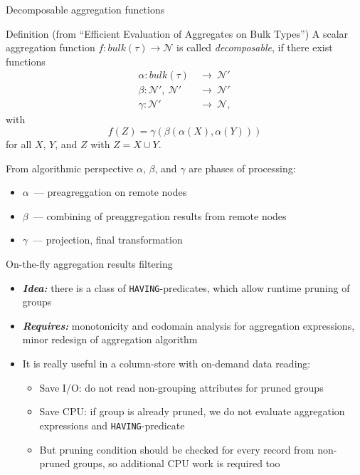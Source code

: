 \documentclass[compress, dvipsnames, unicode]{beamer}
\begin{document}
\begin{frame}{Decomposable aggregation functions}
	\begin{block}{Definition (from ``Efficient Evaluation of Aggregates on Bulk Types'')}
		A scalar aggregation function $f: bulk(\tau) \rightarrow \mathcal{N}$ is called \textit{decomposable}, if there exist functions
		\begin{align*}
		\alpha: bulk(\tau)\ &\rightarrow\ \mathcal{N'}\\
		\beta: \mathcal{N'},\ \mathcal{N'}\ &\rightarrow\ \mathcal{N'}\\
		\gamma: \mathcal{N'}\ &\rightarrow\ \mathcal{N},
		\end{align*}
		with $$f(Z) = \gamma(\beta(\alpha(X), \alpha(Y)))$$
		for all $X$, $Y$, and $Z$ with $Z = X \cup Y$.
	\end{block}

	From algorithmic perspective $\alpha$, $\beta$, and $\gamma$ are phases of processing:
	
	\begin{itemize}
		\item $\alpha$~--- preagreggation on remote nodes
		\item $\beta$~--- combining of preaggregation results from remote nodes
		\item $\gamma$~--- projection, final transformation
	\end{itemize}
\end{frame}


\begin{frame}{On-the-fly aggregation results filtering}
    \begin{itemize}
        \setlength\itemsep{1em}	
        \item \textbf{\textit{Idea:}} there is a class of \texttt{HAVING}-predicates, which allow runtime pruning of groups
        \item \textbf{\textit{Requires: }} monotonicity and codomain analysis for aggregation expressions, minor redesign of aggregation algorithm 
        \item It is really useful in a column-store with on-demand data reading:
        \begin{itemize}
        	\item Save I/O: do not read non-grouping attributes for pruned groups
        	\item Save CPU: if group is already pruned, we do not evaluate aggregation expressions and \texttt{HAVING}-predicate
        	\item But pruning condition should be checked for every record from non-pruned groups, so additional CPU work is required too
        \end{itemize}
    \end{itemize}
    
    \let\thefootnote\relax{} 
\end{frame}
\end{document}
